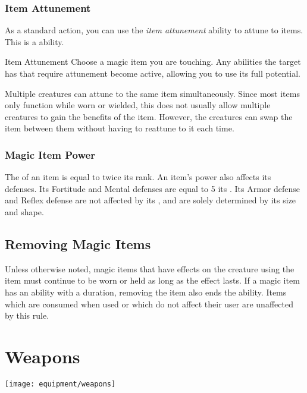         \subsubsection{Item Attunement}\label{Item Attunement}

            As a standard action, you can use the \textit{item attunement} ability to attune to items.
            This is a \magical ability.

            \begin{attuneability}{Item Attunement}{}
                \rankline
                Choose a magic item you are touching.
                Any abilities the target has that require attunement become active, allowing you to use its full potential.
            \end{attuneability}

             Multiple creatures can attune to the same item simultaneously.
            Since most items only function while worn or wielded, this does not usually allow multiple creatures to gain the benefits of the item.
            However, the creatures can swap the item between them without having to reattune to it each time.

    \subsubsection{Magic Item Power}\label{Magic Item Power}
        The  of an item is equal to twice its rank.
        An item's power also affects its defenses.
        Its Fortitude and Mental defenses are equal to 5 \add its .
        Its Armor defense and Reflex defense are not affected by its , and are solely determined by its size and shape.

    \subsection{Removing Magic Items}
        Unless otherwise noted, magic items that have effects on the creature using the item must continue to be worn or held as long as the effect lasts.
        If a magic item has an ability with a duration, removing the item also ends the ability.
        Items which are consumed when used or which do not affect their user are unaffected by this rule.

\newpage
\section{Weapons}\label{Weapons}
    \texttt{[image: equipment/weapons]}

